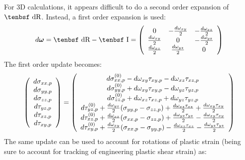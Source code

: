 \documentclass[11pt]{book}
\renewcommand{\vec}[1]{\boldsymbol{#1}}
\def\I{\hbox{\tenbsf I}}
\def\dR{\hbox{\tenbsf dR}}
\begin{document}
For 3D calculations, it appears difficult to do a second order expansion of $\dR$. Instead, a first order expansion is used:
\begin{equation}
    d\vec\omega = \dR-\I = \left(\begin{array}{ccc}
        0 & -{d\omega_{xy}\over2} & -{d\omega_{xz}\over2} \\
        {d\omega_{xy}\over2} & 0 & -{d\omega_{yz}\over2} \\
        {d\omega_{xz}\over2} & {d\omega_{yz}\over2} & 0
         \end{array}\right)
\end{equation}
The first order update becomes:
\begin{equation}
   \left(\begin{array}{c} d\sigma_{xx,p} \\ d\sigma_{yy,p} \\ d\sigma_{zz,p} \\ 
   						d\tau_{yz,p} \\ d\tau_{xz,p} \\ d\tau_{xy,p} \end{array}\right) = 
   \left(\begin{array}{c} d\sigma_{xx,p}^{(0)} - d\omega_{xy}\tau_{xy,p} - d\omega_{xz}\tau_{xz,p} \\
                d\sigma_{yy,p}^{(0)} + d\omega_{xy}\tau_{xy,p} - d\omega_{yz}\tau_{yz,p} \\
                d\sigma_{zz,p}^{(0)} + d\omega_{xz}\tau_{xz,p} + d\omega_{yz}\tau_{yz,p} \\
                d\tau_{yz,p}^{(0)} + {d\omega_{yz}\over2}(\sigma_{yy,p}-\sigma_{zz,p})
                      + {d\omega_{xz}\tau_{xz}\over 2} + {d\omega_{xy}\tau_{xy}\over 2}   \\
                d\tau_{xz,p}^{(0)} + {d\omega_{xz}\over2}(\sigma_{xx,p}-\sigma_{zz,p})
                      + {d\omega_{yz}\tau_{yz}\over 2} - {d\omega_{xy}\tau_{xy}\over 2}   \\
                d\tau_{xy,p}^{(0)} + {d\omega_{xy}\over2}(\sigma_{xx,p}-\sigma_{yy,p})
                      - {d\omega_{xz}\tau_{xz}\over 2} - {d\omega_{yz}\tau_{yz}\over 2}
           \end{array}\right)
\end{equation}
The same update can be used to account for rotations of plastic strain (being sure to account for tracking of engineering plastic shear strain) as:
\end{document}
